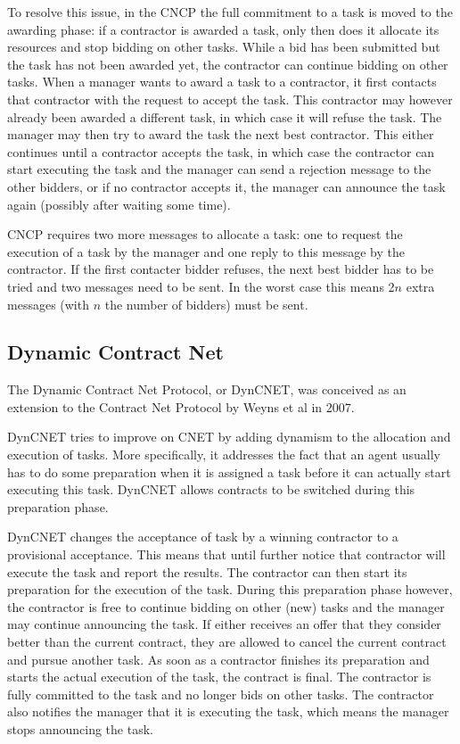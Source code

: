 \documentclass[10pt,a4paper]{article}
\begin{document}
To resolve this issue, in the CNCP the full commitment to a task is moved to the awarding phase: if a contractor is awarded a task, only then does it allocate its resources and stop bidding on other tasks. While a bid has been submitted but the task has not been awarded yet, the contractor can continue bidding on other tasks. When a manager wants to award a task to a contractor, it first contacts that contractor with the request to accept the task. This contractor may however already been awarded a different task, in which case it will refuse the task. The manager may then try to award the task the next best contractor. This either continues until a contractor accepts the task, in which case the contractor can start executing the task and the manager can send a rejection message to the other bidders, or if no contractor accepts it, the manager can announce the task again (possibly after waiting some time).

CNCP requires two more messages to allocate a task: one to request the execution of a task by the manager and one reply to this message by the contractor. If the first contacter bidder refuses, the next best bidder has to be tried and two messages need to be sent. In the worst case this means 2$n$ extra messages (with $n$ the number of bidders) must be sent.

\subsection{Dynamic Contract Net}
The Dynamic Contract Net Protocol, or DynCNET, was conceived as an extension to the Contract Net Protocol by Weyns et al in 2007. \cite{DynCNET}

DynCNET tries to improve on CNET by adding dynamism to the allocation and execution of tasks. More specifically, it addresses the fact that an agent usually has to do some preparation when it is assigned a task before it can actually start executing this task. DynCNET allows contracts to be switched during this preparation phase.

DynCNET changes the acceptance of task by a winning contractor to a provisional acceptance. This means that until further notice that contractor will execute the task and report the results. The contractor can then start its preparation for the execution of the task. During this preparation phase however, the contractor is free to continue bidding on other (new) tasks and the manager may continue announcing the task. If either receives an offer that they consider better than the current contract, they are allowed to cancel the current contract and pursue another task. As soon as a contractor finishes its preparation and starts the actual execution of the task, the contract is final. The contractor is fully committed to the task and no longer bids on other tasks. The contractor also notifies the manager that it is executing the task, which means the manager stops announcing the task.
\end{document}
